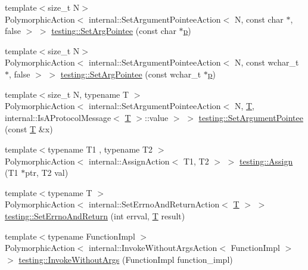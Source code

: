 \begin{DoxyCompactItemize}
\item 
{\footnotesize template$<$size\+\_\+t N$>$ }\\Polymorphic\+Action$<$ internal\+::\+Set\+Argument\+Pointee\+Action$<$ N, const char $\ast$, false $>$ $>$ \hyperlink{namespacetesting_a4a190fd2d02fb7cd79c5b3df3f80b647}{testing\+::\+Set\+Arg\+Pointee} (const char $\ast$\hyperlink{jquery_8js_a2335e57f79b6acfb6de59c235dc8a83e}{p})
\item 
{\footnotesize template$<$size\+\_\+t N$>$ }\\Polymorphic\+Action$<$ internal\+::\+Set\+Argument\+Pointee\+Action$<$ N, const wchar\+\_\+t $\ast$, false $>$ $>$ \hyperlink{namespacetesting_ac128085b4a8d64563fd5ccef324ea177}{testing\+::\+Set\+Arg\+Pointee} (const wchar\+\_\+t $\ast$\hyperlink{jquery_8js_a2335e57f79b6acfb6de59c235dc8a83e}{p})
\item 
{\footnotesize template$<$size\+\_\+t N, typename T $>$ }\\Polymorphic\+Action$<$ internal\+::\+Set\+Argument\+Pointee\+Action$<$ N, \hyperlink{functions__7_8js_adf1f3edb9115acb0a1e04209b7a9937b}{T}, internal\+::\+Is\+A\+Protocol\+Message$<$ \hyperlink{functions__7_8js_adf1f3edb9115acb0a1e04209b7a9937b}{T} $>$\+::value $>$ $>$ \hyperlink{namespacetesting_a03b315d27c91a8e719f2b6c09964130b}{testing\+::\+Set\+Argument\+Pointee} (const \hyperlink{functions__7_8js_adf1f3edb9115acb0a1e04209b7a9937b}{T} \&x)
\item 
{\footnotesize template$<$typename T1 , typename T2 $>$ }\\Polymorphic\+Action$<$ internal\+::\+Assign\+Action$<$ T1, T2 $>$ $>$ \hyperlink{namespacetesting_abfc4121b8708e8b22a096ff8be88a9d0}{testing\+::\+Assign} (T1 $\ast$ptr, T2 val)
\item 
{\footnotesize template$<$typename T $>$ }\\Polymorphic\+Action$<$ internal\+::\+Set\+Errno\+And\+Return\+Action$<$ \hyperlink{functions__7_8js_adf1f3edb9115acb0a1e04209b7a9937b}{T} $>$ $>$ \hyperlink{namespacetesting_a31095e421f167fade2e6d4d60df1f4da}{testing\+::\+Set\+Errno\+And\+Return} (int errval, \hyperlink{functions__7_8js_adf1f3edb9115acb0a1e04209b7a9937b}{T} result)
\item 
{\footnotesize template$<$typename Function\+Impl $>$ }\\Polymorphic\+Action$<$ internal\+::\+Invoke\+Without\+Args\+Action$<$ Function\+Impl $>$ $>$ \hyperlink{namespacetesting_a88cc1999296bc630f6a49cdf66bb21f9}{testing\+::\+Invoke\+Without\+Args} (Function\+Impl function\+\_\+impl)
\item 

\end{DoxyCompactItemize}
